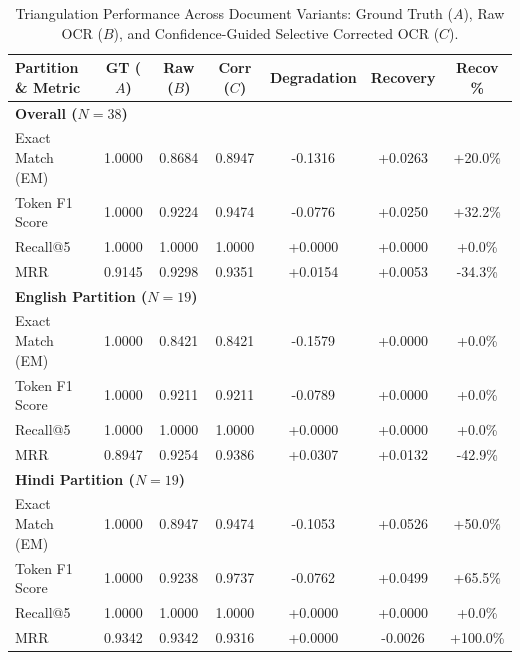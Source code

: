 \begin{table}[htbp]
\centering
\caption{Triangulation Performance Across Document Variants: Ground Truth ($A$), Raw OCR ($B$), and Confidence-Guided Selective Corrected OCR ($C$).}
\label{tab:triangulation}
\begin{tabular}{lcccccc}
\toprule
\textbf{Partition \& Metric} & \textbf{GT ($A$)} & \textbf{Raw ($B$)} & \textbf{Corr ($C$)} & \textbf{Degradation} & \textbf{Recovery} & \textbf{Recov \%} \\
\midrule
\multicolumn{7}{l}{\textbf{Overall ($N=38$)}} \\
Exact Match (EM) & 1.0000 & 0.8684 & 0.8947 & -0.1316 & +0.0263 & +20.0\% \\
Token F1 Score & 1.0000 & 0.9224 & 0.9474 & -0.0776 & +0.0250 & +32.2\% \\
Recall@5 & 1.0000 & 1.0000 & 1.0000 & +0.0000 & +0.0000 & +0.0\% \\
MRR & 0.9145 & 0.9298 & 0.9351 & +0.0154 & +0.0053 & -34.3\% \\
\midrule
\multicolumn{7}{l}{\textbf{English Partition ($N=19$)}} \\
Exact Match (EM) & 1.0000 & 0.8421 & 0.8421 & -0.1579 & +0.0000 & +0.0\% \\
Token F1 Score & 1.0000 & 0.9211 & 0.9211 & -0.0789 & +0.0000 & +0.0\% \\
Recall@5 & 1.0000 & 1.0000 & 1.0000 & +0.0000 & +0.0000 & +0.0\% \\
MRR & 0.8947 & 0.9254 & 0.9386 & +0.0307 & +0.0132 & -42.9\% \\
\midrule
\multicolumn{7}{l}{\textbf{Hindi Partition ($N=19$)}} \\
Exact Match (EM) & 1.0000 & 0.8947 & 0.9474 & -0.1053 & +0.0526 & +50.0\% \\
Token F1 Score & 1.0000 & 0.9238 & 0.9737 & -0.0762 & +0.0499 & +65.5\% \\
Recall@5 & 1.0000 & 1.0000 & 1.0000 & +0.0000 & +0.0000 & +0.0\% \\
MRR & 0.9342 & 0.9342 & 0.9316 & +0.0000 & -0.0026 & +100.0\% \\
\bottomrule
\end{tabular}
\end{table}